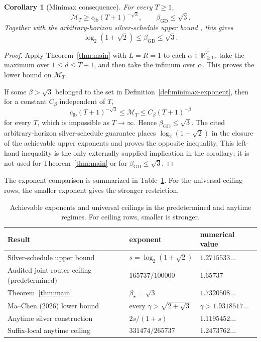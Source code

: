 \documentclass[11pt]{article}
\newtheorem{corollary}[theorem]{Corollary}
\theoremstyle{definition}
\theoremstyle{remark}
\newcommand{\R}{\mathbb{R}}
\newcommand{\criticalexp}{\beta_{\star}}
\newcommand{\gdexp}{\beta_{\mathrm{GD}}}
\newcommand{\lbconst}{c_{\mathrm{lb}}}
\begin{document}
\begin{corollary}[Minimax consequence]
\label{cor:minimax-consequence}
For every \(T\ge1\),
\[
 \mathcal M_T\ge\lbconst(T+1)^{-\sqrt3},
 \qquad
 \gdexp\le\sqrt3.
\]
Together with the arbitrary-horizon silver-schedule upper bound
\cite{altschuler2025silver,zhangjiang2024}, this gives
\begin{equation}
\boxed{
 \log_2(1+\sqrt2)
 \le \gdexp
 \le \sqrt3.}
 \label{eq:minimax-exponent-bracket}
\end{equation}
\end{corollary}

\begin{proof}
Apply Theorem~\ref{thm:main} with \(L=R=1\) to each
\(\alpha\in\R_{\ge0}^T\), take the maximum over \(1\le d\le T+1\), and then
take the infimum over \(\alpha\).  This proves the lower bound on
\(\mathcal M_T\).

If some \(\beta>\sqrt3\) belonged to the set in
Definition~\ref{def:minimax-exponent}, then for a constant \(C_\beta\)
independent of \(T\),
\[
 \lbconst(T+1)^{-\sqrt3}
 \le\mathcal M_T
 \le C_\beta(T+1)^{-\beta}
\]
for every \(T\), which is impossible as \(T\to\infty\).  Hence
\(\gdexp\le\sqrt3\).  The cited arbitrary-horizon
silver-schedule guarantee places \(\log_2(1+\sqrt2)\) in the closure of
the achievable upper exponents and proves the opposite inequality.  This
left-hand inequality is the only externally supplied implication in the
corollary; it is not used for Theorem~\ref{thm:main} or for
\(\gdexp\le\sqrt3\).
\end{proof}

The exponent comparison is summarized in Table~\ref{tab:exponents}.  For
the universal-ceiling rows, the smaller exponent gives the stronger
restriction.

\begin{table}[ht]
\centering
\begin{tabular}{@{}lll@{}}
\toprule
Result & exponent & numerical value\\
\midrule
Silver-schedule upper bound
  \cite{altschuler2025silver,zhangjiang2024}
  & \(s=\log_2(1+\sqrt2)\) & \(1.2715533\ldots\)\\
Audited joint-router ceiling (predetermined)
  & \(165737/100000\) & \(1.65737\)\\
Theorem~\ref{thm:main}
  & \(\criticalexp=\sqrt3\) & \(1.7320508\ldots\)\\
Ma--Chen (2026) lower bound \cite{machen2026}
  & every \(\gamma>\sqrt{2+\sqrt3}\) & \(\gamma>1.9318517\ldots\)\\
Anytime silver construction \cite{zhangetal2025anytime}
  & \(2s/(1+s)\) & \(1.1195452\ldots\)\\
Suffix-local anytime ceiling
  & \(331474/265737\) & \(1.2473762\ldots\)\\
\bottomrule
\end{tabular}
\caption{Achievable exponents and universal ceilings in the predetermined
and anytime regimes.  For ceiling rows, smaller is stronger.}
\label{tab:exponents}
\end{table}
\end{document}
